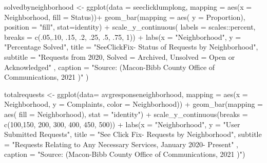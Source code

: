 \documentclass[
]{article}
\newenvironment{Shaded}{\begin{snugshade}}{\end{snugshade}}
\newcommand{\AttributeTok}[1]{\textcolor[rgb]{0.77,0.63,0.00}{#1}}
\newcommand{\DecValTok}[1]{\textcolor[rgb]{0.00,0.00,0.81}{#1}}
\newcommand{\FunctionTok}[1]{\textcolor[rgb]{0.00,0.00,0.00}{#1}}
\newcommand{\NormalTok}[1]{#1}
\newcommand{\OtherTok}[1]{\textcolor[rgb]{0.56,0.35,0.01}{#1}}
\newcommand{\SpecialCharTok}[1]{\textcolor[rgb]{0.00,0.00,0.00}{#1}}
\newcommand{\StringTok}[1]{\textcolor[rgb]{0.31,0.60,0.02}{#1}}
\begin{document}
\begin{Shaded}
\begin{Highlighting}[]
\NormalTok{solvedbyneighborhood }\OtherTok{\textless{}{-}} \FunctionTok{ggplot}\NormalTok{(}\AttributeTok{data =}\NormalTok{ seeclicklumplong, }\AttributeTok{mapping =} \FunctionTok{aes}\NormalTok{(}\AttributeTok{x =}\NormalTok{ Neighborhood, }\AttributeTok{fill =}\NormalTok{ Status))}\SpecialCharTok{+}
 \FunctionTok{geom\_bar}\NormalTok{(}\AttributeTok{mapping =} \FunctionTok{aes}\NormalTok{( }\AttributeTok{y =}\NormalTok{ Proportion), }\AttributeTok{position =} \StringTok{"fill"}\NormalTok{, }\AttributeTok{stat=}\StringTok{\textquotesingle{}identity\textquotesingle{}}\NormalTok{)  }\SpecialCharTok{+} 
  \FunctionTok{scale\_y\_continuous}\NormalTok{(}
   \AttributeTok{labels =}\NormalTok{ scales}\SpecialCharTok{::}\NormalTok{percent, }
      \AttributeTok{breaks =} \FunctionTok{c}\NormalTok{(.}\DecValTok{05}\NormalTok{,.}\DecValTok{10}\NormalTok{, .}\DecValTok{15}\NormalTok{, .}\DecValTok{2}\NormalTok{, .}\DecValTok{25}\NormalTok{, .}\DecValTok{5}\NormalTok{, .}\DecValTok{75}\NormalTok{, }\DecValTok{1}\NormalTok{))  }\SpecialCharTok{+}
  \FunctionTok{labs}\NormalTok{(}\AttributeTok{x =} \StringTok{"Neighborhood"}\NormalTok{, }\AttributeTok{y =} \StringTok{"Percentage Solved"}\NormalTok{,}
     \AttributeTok{title =} \StringTok{"SeeClickFix{-} Status of Requests by Neighborhood"}\NormalTok{,}
     \AttributeTok{subtitle =} \StringTok{"Requests from 2020, Solved = Archived, Unsolved = Open or Acknowledged"}\NormalTok{ ,}
     \AttributeTok{caption =} \StringTok{"Source: (Macon{-}Bibb County Office of Communications, 2021 )"}\NormalTok{ ) }


 

\NormalTok{totalrequests }\OtherTok{\textless{}{-}} \FunctionTok{ggplot}\NormalTok{(}\AttributeTok{data=}\NormalTok{ avgresponseneighborhood, }\AttributeTok{mapping =} \FunctionTok{aes}\NormalTok{(}\AttributeTok{x =}\NormalTok{ Neighborhood, }\AttributeTok{y =}\NormalTok{ Complaints, }\AttributeTok{color =}\NormalTok{ Neighborhood)) }\SpecialCharTok{+}
  \FunctionTok{geom\_bar}\NormalTok{(}\AttributeTok{mapping =} \FunctionTok{aes}\NormalTok{( }\AttributeTok{fill =}\NormalTok{ Neighborhood), }\AttributeTok{stat =} \StringTok{"identity"}\NormalTok{) }\SpecialCharTok{+} \FunctionTok{scale\_y\_continuous}\NormalTok{(}\AttributeTok{breaks =} \FunctionTok{c}\NormalTok{(}\DecValTok{100}\NormalTok{,}\DecValTok{150}\NormalTok{, }\DecValTok{200}\NormalTok{, }\DecValTok{300}\NormalTok{, }\DecValTok{400}\NormalTok{, }\DecValTok{450}\NormalTok{, }\DecValTok{500}\NormalTok{)) }\SpecialCharTok{+}
  \FunctionTok{labs}\NormalTok{(}\AttributeTok{x =} \StringTok{"Neighborhood"}\NormalTok{, }\AttributeTok{y =} \StringTok{"User Submitted Requests"}\NormalTok{,}
     \AttributeTok{title =} \StringTok{"See Click Fix{-} Requests by Neighborhood"}\NormalTok{,}
     \AttributeTok{subtitle =} \StringTok{"Requests Relating to Any Necessary Services, January 2020{-} Present"}\NormalTok{ ,}
     \AttributeTok{caption =} \StringTok{"Source: (Macon{-}Bibb County Office of Communications, 2021 )"}\NormalTok{) }
  

\end{Highlighting}
\end{Shaded}
\end{document}
